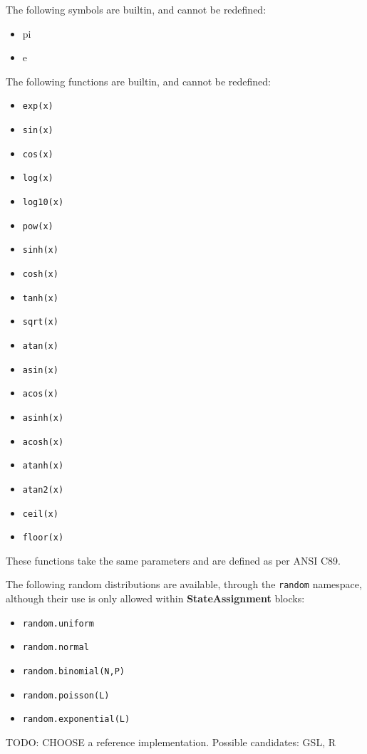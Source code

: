 \documentclass{article}
\newcommand{\StateAssignment}{{\bf{StateAssignment}}\xspace}
\begin{document}
The following symbols are builtin, and cannot be redefined:
\begin{itemize}
\item pi
\item e
\end{itemize}


The following functions are builtin, and cannot be redefined:
\begin{itemize}
\item \verb|exp(x)|
\item \verb|sin(x)|
\item \verb|cos(x)|
\item \verb|log(x)|
\item \verb|log10(x)|
\item \verb|pow(x)|
\item \verb|sinh(x)|
\item \verb|cosh(x)|
\item \verb|tanh(x)|
\item \verb|sqrt(x)|
\item \verb|atan(x)|
\item \verb|asin(x)|
\item \verb|acos(x)|
\item \verb|asinh(x)|
\item \verb|acosh(x)|
\item \verb|atanh(x)|
\item \verb|atan2(x)|
\item \verb|ceil(x)|
\item \verb|floor(x)|
\end{itemize}

These functions take the same parameters and are defined as per ANSI C89.

The following random distributions are available, through the \verb|random| namespace,
although their use is only allowed within \StateAssignment blocks:

\begin{itemize}
\item \verb|random.uniform|
\item \verb|random.normal|
\item \verb|random.binomial(N,P)|
\item \verb|random.poisson(L)|
\item \verb|random.exponential(L)|
\end{itemize}

TODO: CHOOSE a reference implementation. Possible candidates: GSL, R
\end{document}
